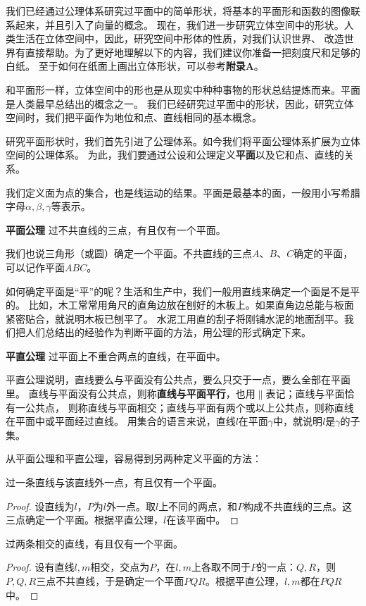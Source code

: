 \documentclass[12pt,UTF8,fontset=none]{ctexbook}
\begin{document}
我们已经通过公理体系研究过平面中的简单形状，将基本的平面形和函数的图像联系起来，并且引入了向量的概念。
现在，我们进一步研究立体空间中的形状。人类生活在立体空间中，因此，研究空间中形体的性质，对我们认识世界、
改造世界有直接帮助。为了更好地理解以下的内容，我们建议你准备一把刻度尺和足够的白纸。
至于如何在纸面上画出立体形状，可以参考\textbf{附录A}。


和平面形一样，立体空间中的形也是从现实中种种事物的形状总结提炼而来。平面是人类最早总结出的概念之一。
我们已经研究过平面中的形状，因此，研究立体空间时，我们把平面作为地位和点、直线相同的基本概念。

研究平面形状时，我们首先引进了公理体系。如今我们将平面公理体系扩展为立体空间的公理体系。
为此，我们要通过公设和公理定义\textbf{平面}以及它和点、直线的关系。

我们定义面为点的集合，也是线运动的结果。平面是最基本的面，一般用小写希腊字母$\alpha,\beta,\gamma$等表示。
\begin{po}{\textbf{平面公理}}\label{po:0}
    过不共直线的三点，有且仅有一个平面。
\end{po}

我们也说三角形（或圆）确定一个平面。不共直线的三点$A$、$B$、$C$确定的平面，可以记作平面$ABC$。

如何确定平面是“平”的呢？生活和生产中，我们一般用直线来确定一个面是不是平的。
比如，木工常常用角尺的直角边放在刨好的木板上。如果直角边总能与板面紧密贴合，就说明木板已刨平了。
水泥工用直的刮子将刚铺水泥的地面刮平。我们把人们总结出的经验作为判断平面的方法，用公理的形式确定下来。
\begin{po}{\textbf{平直公理}}\label{po:1}
    过平面上不重合两点的直线，在平面中。
\end{po}
平直公理说明，直线要么与平面没有公共点，要么只交于一点，要么全部在平面里。
直线与平面没有公共点，则称\textbf{直线与平面平行}，也用$\parallel$表记；直线与平面恰有一公共点，
则称直线与平面相交；直线与平面有两个或以上公共点，则称直线在平面中或平面经过直线。
用集合的语言来说，直线$l$在平面$\gamma$中，就说明$l$是$\gamma$的子集。

从平面公理和平直公理，容易得到另两种定义平面的方法：
\begin{tm}\label{tm:1-0-0}
    过一条直线与该直线外一点，有且仅有一个平面。
\end{tm}
\begin{proof}
    设直线为$l$，$P$为$l$外一点。取$l$上不同的两点，和$P$构成不共直线的三点。这三点确定一个平面。根据平直公理，$l$在该平面中。
\end{proof}
\begin{tm}\label{tm:1-0-1}
    过两条相交的直线，有且仅有一个平面。
\end{tm}
\begin{proof}
    设有直线$l,m$相交，交点为$P$，在$l,m$上各取不同于$P$的一点：$Q,R$，则$P,Q,R$三点不共直线，于是确定一个平面$PQR$。根据平直公理，$l,m$都在$PQR$中。
\end{proof}
\end{document}
